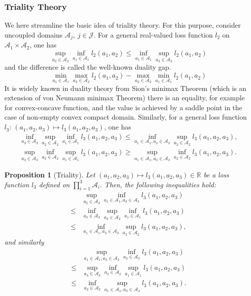 \documentclass{article}
\newtheorem{proposition}{Proposition}
\begin{document}
\subsubsection{Triality Theory}
\label{sec:TT}
We here streamline the basic idea of triality theory. For this purpose, consider uncoupled domains
$\mathcal{A}_j,\ j\in \mathcal{J}$. For a general real-valued loss function $l_2$ on $\mathcal{A}_1 \times \mathcal{A}_2$, one has
$$\sup_{a_2\in \mathcal{A}_2}\inf_{a_1\in \mathcal{A}_1}l_2(a_1,a_2)\leq \inf_{a_1\in \mathcal{A}_1}\sup_{a_2\in \mathcal{A}_2}l_2(a_1,a_2)
$$
and the difference is called the well-known duality gap.
$$\min_{a_1\in \mathcal{A}_1}\max_{a_2\in \mathcal{A}_2}l_2(a_1,a_2)-\max_{a_2\in \mathcal{A}_2}\min_{a_1\in \mathcal{A}_1}l_2(a_1,a_2)
$$
It is widely known in duality theory from Sion's minimax Theorem \cite{sion1958} (which is an extension of von Neumann minimax Theorem) there is an equality, for example for convex-concave function, and the value is achieved by a saddle point in the case of non-empty convex compact domain.
Similarly, for a general loss function $l_3$: $(a_1,a_2, a_3) \mapsto l_3(a_1,a_2, a_3)$, one has
\begin{eqnarray*}
\inf_{a_3\in \mathcal{A}_3}\sup_{a_2\in \mathcal{A}_2}\inf_{a_1\in \mathcal{A}_1}l_3(a_1, a_2, a_3)\leq
\inf_{a_1\in \mathcal{A}_1,a_3\in \mathcal{A}_3}\sup_{a_2\in \mathcal{A}_2}l_3(a_1, a_2, a_3), \\
\sup_{a_3\in \mathcal{A}_3}\inf_{a_2\in \mathcal{A}_2}\sup_{a_1\in \mathcal{A}_1}l_3(a_1, a_2, a_3)\geq
\sup_{a_1\in \mathcal{A}_1,a_3\in \mathcal{A}_3}\inf_{a_2\in \mathcal{A}_2}l_3(a_1, a_2, a_3).
\end{eqnarray*}
\begin{proposition}[Triality]
Let $(a_1,a_2, a_3) \mapsto l_3(a_1,a_2, a_3) \in \mathbb{R}$ be a loss function $l_3$ defined on $\prod_{i=1}^3 \mathcal{A}_i$. Then, the following inequalities hold:
\begin{equation} \label{eqtri}
\begin{array}{ll}
&\sup_{a_2\in \mathcal{A}_2}\inf_{a_1\in \mathcal{A}_1,a_3\in \mathcal{A}_3}l_3(a_1,a_2, a_3) \\
\leq &\inf_{a_3\in \mathcal{A}_3}\sup_{a_2\in \mathcal{A}_2}\inf_{a_1\in \mathcal{A}_1}l_3(a_1,a_2, a_3) \\
\leq &\inf_{a_1\in \mathcal{A}_1,a_3\in \mathcal{A}_3}\sup_{a_2\in \mathcal{A}_2}l_3(a_1,a_2, a_3),
\end{array}
\end{equation}
and similarly
\begin{equation} \label{eqtri2}
\begin{array}{ll}
&\sup_{a_1\in \mathcal{A}_1,a_3\in \mathcal{A}_3}\inf_{a_2\in \mathcal{A}_2}l_3(a_1,a_2, a_3) \\
\leq &\sup_{a_3\in \mathcal{A}_3}\inf_{a_2\in \mathcal{A}_2}\sup_{a_1\in \mathcal{A}_1}l_3(a_1,a_2, a_3) \\
\leq &\inf_{a_2\in \mathcal{A}_2}\sup_{a_1\in \mathcal{A}_1,a_3\in \mathcal{A}_3}l_3(a_1,a_2, a_3).
\end{array}
\end{equation}
\end{proposition}
\end{document}
